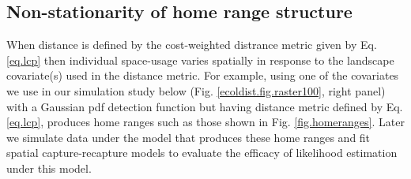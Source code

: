 \documentclass[12pt]{article}
\begin{document}

\subsection{Non-stationarity of home range structure}

When distance is defined by the cost-weighted distrance metric given
by Eq. \ref{eq.lcp} then individual space-usage varies
spatially in response to the landscape covariate(s) used in the
distance metric. For example, using one of the covariates we use in
our simulation study below (Fig. \ref{ecoldist.fig.raster100}, right
panel) with a Gaussian pdf detection function but having distance
metric defined by Eq. \ref{eq.lcp}, produces home ranges such
as those shown in Fig. \ref{fig.homeranges}. Later we simulate data
under the model that produces these home ranges and fit spatial
capture-recapture models to evaluate the efficacy of likelihood
estimation under this model. 
\end{document}
